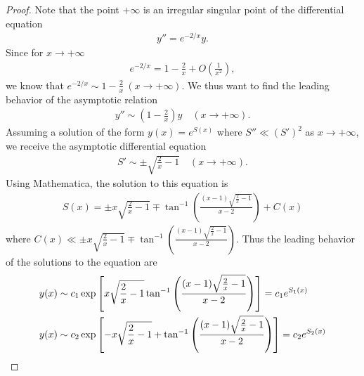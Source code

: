 \documentclass[12pt]{article}
\theoremstyle{definition}
\begin{document}
\begin{proof}
  Note that the point $+\infty$ is an irregular singular point of the differential equation
  \begin{align*}
    y'' = e^{-2/x}y.
  \end{align*}
  Since for $x\to+\infty$
  \begin{align*}
    e^{-2/x} = 1 - \frac{2}{x} + O\left(\frac{1}{x^2}\right),
  \end{align*}
  we know that $e^{-2/x} \sim 1 - \frac{2}{x}\ (x\to +\infty)$. We thus want to find the leading behavior of the
  asymptotic relation
  \begin{align*}
    y'' \sim \left(1-\frac{2}{x}\right)y \quad (x\to+\infty).
  \end{align*}
  Assuming a solution of the form $y(x) = e^{S(x)}$ where $S'' \ll (S')^2$ as $x\to+\infty$, we receive the asymptotic
  differential equation
  \begin{align*}
    S' \sim \pm \sqrt{\frac{2}{x} -1} \quad (x\to+\infty).
  \end{align*}
  Using Mathematica, the solution to this equation is
  \begin{align*}
    S(x) = \pm x\sqrt{\frac{2}{x} - 1}\mp \tan^{-1}\left(\frac{(x-1)\sqrt{\frac{2}{x} -1 }}{x-2}\right) + C(x)
  \end{align*}
  where $C(x) \ll \pm x\sqrt{\frac{2}{x} - 1}\mp \tan^{-1}\left(\frac{(x-1)\sqrt{\frac{2}{x} -1 }}{x-2}\right)$.
  Thus the leading behavior of the solutions to the equation are
  \begin{align*}
    y(x) &\sim c_1 \exp{\left[ x\sqrt{\frac{2}{x} - 1}\- \tan^{-1}\left(\frac{(x-1)\sqrt{\frac{2}{x} -1 }}{x-2}\right)\right]} = c_1e^{S_1(x)} \\
    y(x) &\sim c_2 \exp{\left[- x\sqrt{\frac{2}{x} - 1}+ \tan^{-1}\left(\frac{(x-1)\sqrt{\frac{2}{x} -1 }}{x-2}\right)\right]} = c_2e^{S_2(x)}
  \end{align*}


\end{proof}
\end{document}
